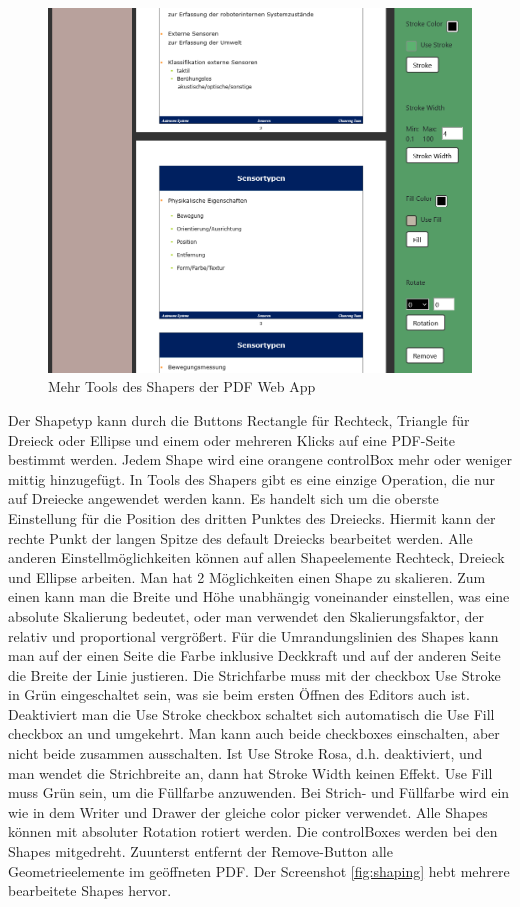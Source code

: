 \begin{figure}[!htbp]
	\centering
	\includegraphics[width=1\textwidth]{"images/shaper2.png"}
	\caption{Mehr Tools des Shapers der PDF Web App}
	\label{fig:shaper2}
\end{figure}

Der Shapetyp kann durch die Buttons Rectangle für Rechteck, Triangle für Dreieck oder Ellipse und einem oder mehreren Klicks auf eine PDF-Seite bestimmt werden. Jedem Shape wird eine orangene controlBox mehr oder weniger mittig hinzugefügt. In Tools des Shapers gibt es eine einzige Operation, die nur auf Dreiecke angewendet werden kann. Es handelt sich um die oberste Einstellung für die Position des dritten Punktes des Dreiecks. Hiermit kann der rechte Punkt der langen Spitze des default Dreiecks bearbeitet werden. Alle anderen Einstellmöglichkeiten können auf allen Shapeelemente Rechteck, Dreieck und Ellipse arbeiten. Man hat 2 Möglichkeiten einen Shape zu skalieren. Zum einen kann man die Breite und Höhe unabhängig voneinander einstellen, was eine absolute Skalierung bedeutet, oder man verwendet den Skalierungsfaktor, der relativ und proportional vergrößert. Für die Umrandungslinien des Shapes kann man auf der einen Seite die Farbe inklusive Deckkraft und auf der anderen Seite die Breite der Linie justieren. Die Strichfarbe muss mit der checkbox Use Stroke in Grün eingeschaltet sein, was sie beim ersten Öffnen des Editors auch ist. Deaktiviert man die Use Stroke checkbox schaltet sich automatisch die Use Fill checkbox an und umgekehrt. Man kann auch beide checkboxes einschalten, aber nicht beide zusammen ausschalten. Ist Use Stroke Rosa, d.h. deaktiviert, und man wendet die Strichbreite an, dann hat Stroke Width keinen Effekt. Use Fill muss Grün sein, um die Füllfarbe anzuwenden. Bei Strich- und Füllfarbe wird ein wie in dem Writer und Drawer der gleiche color picker verwendet. Alle Shapes können mit absoluter Rotation rotiert werden. Die controlBoxes werden bei den Shapes mitgedreht. Zuunterst entfernt der Remove-Button alle Geometrieelemente im geöffneten PDF. Der Screenshot \ref{fig:shaping} hebt mehrere bearbeitete Shapes hervor.

